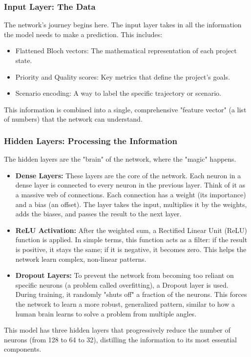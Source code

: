 \documentclass{article}
\begin{document}
\subsubsection*{Input Layer: The Data}
The network's journey begins here. The input layer takes in all the information the model needs to make a prediction. This includes:
\begin{itemize}
\item Flattened Bloch vectors: The mathematical representation of each project state.
\item Priority and Quality scores: Key metrics that define the project's goals.
\item Scenario encoding: A way to label the specific trajectory or scenario.
\end{itemize}
This information is combined into a single, comprehensive "feature vector" (a list of numbers) that the network can understand.

\subsubsection*{Hidden Layers: Processing the Information}
The hidden layers are the "brain" of the network, where the "magic" happens.
\begin{itemize}
\item \textbf{Dense Layers:} These layers are the core of the network. Each neuron in a dense layer is connected to every neuron in the previous layer. Think of it as a massive web of connections. Each connection has a weight (its importance) and a bias (an offset). The layer takes the input, multiplies it by the weights, adds the biases, and passes the result to the next layer.
\item \textbf{ReLU Activation:} After the weighted sum, a Rectified Linear Unit (ReLU) function is applied. In simple terms, this function acts as a filter: if the result is positive, it stays the same; if it is negative, it becomes zero. This helps the network learn complex, non-linear patterns.
\item \textbf{Dropout Layers:} To prevent the network from becoming too reliant on specific neurons (a problem called overfitting), a Dropout layer is used. During training, it randomly "shuts off" a fraction of the neurons. This forces the network to learn a more robust, generalized pattern, similar to how a human brain learns to solve a problem from multiple angles.
\end{itemize}
This model has three hidden layers that progressively reduce the number of neurons (from 128 to 64 to 32), distilling the information to its most essential components.
\end{document}

